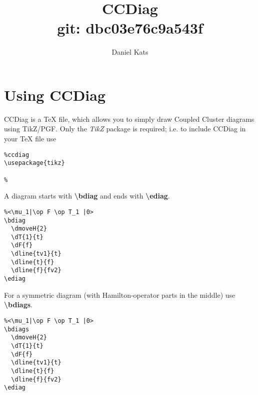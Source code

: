 \documentclass[a4paper]{article}
\begin{document}
\author{Daniel Kats}
\title{CCDiag \\ \normalsize git: dbc03e76c9a543f}

\maketitle

\tableofcontents

\section{Using CCDiag}

CCDiag is a TeX file, which allows you to simply draw Coupled Cluster diagrams using TikZ/PGF.
Only the {\it TikZ} package is required; i.e. to include CCDiag in your TeX file use
\begin{lstlisting}
%ccdiag
\usepackage{tikz}

%  
\end{lstlisting}

A diagram starts with {\bf \textbackslash bdiag} and ends with {\bf \textbackslash ediag}.

 \begin{minipage}[b]{0.5\linewidth}\centering
  \begin{lstlisting}
%<\mu_1|\op F \op T_1 |0>
\bdiag
  \dmoveH{2}
  \dT{1}{t}
  \dF{f}
  \dline{tv1}{t}
  \dline{t}{f}
  \dline{f}{fv2}
\ediag 
  \end{lstlisting}
 \end{minipage}
 \begin{minipage}[b]{0.5\linewidth}\centering
    \bdiag
    \ediag
 \end{minipage}

For a symmetric diagram (with Hamilton-operator parts in the middle) use {\bf \textbackslash bdiags}.

 \begin{minipage}[b]{0.5\linewidth}\centering
  \begin{lstlisting}
%<\mu_1|\op F \op T_1 |0>
\bdiags
  \dmoveH{2}
  \dT{1}{t}
  \dF{f}
  \dline{tv1}{t}
  \dline{t}{f}
  \dline{f}{fv2}
\ediag 
  \end{lstlisting}
 \end{minipage}
 \begin{minipage}[b]{0.5\linewidth}\centering
    \bdiags
    \ediag
 \end{minipage}
\end{document}
